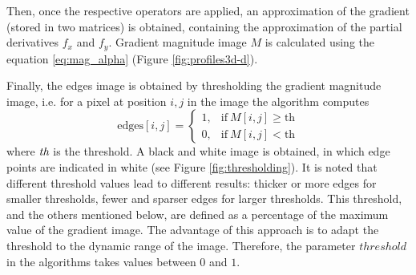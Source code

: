 \documentclass{ipol}
\numberwithin{equation}{section}
\numberwithin{table}{section}
\begin{document}
Then, once the respective operators are applied, an approximation of the gradient (stored in two matrices) 
is obtained, containing the approximation of the partial derivatives $f_x$ and $f_y$. Gradient magnitude 
image $M$ is calculated using the equation \ref{eq:mag_alpha} (Figure \ref{fig:profiles3d-d}). 

Finally, the edges image is obtained by thresholding the gradient magnitude image, i.e. for a pixel at position $i,j$ in the image the algorithm computes
\begin{equation*}
	\mbox{edges}[i,j] = \begin{cases} 1,& \mbox{if}\ M[i,j]\geq\mbox{th} \\
									0,& \mbox{if}\ M[i,j]<\mbox{th}
					  \end{cases}
\end{equation*}
where $\emph{th}$ is the threshold. A black and white image is obtained, in which edge points are indicated in white (see Figure \ref{fig:thresholding}). 
It is noted that different threshold values lead to different results: thicker or more edges for smaller thresholds, fewer and sparser edges for larger thresholds. This threshold, and the others mentioned below, are defined as a percentage of the maximum value 
of the gradient image. The advantage of this approach is to adapt the threshold to the dynamic range of the image. 
Therefore, the parameter $threshold$ in the algorithms takes values ​​between $0$ and $1$.
\end{document}
